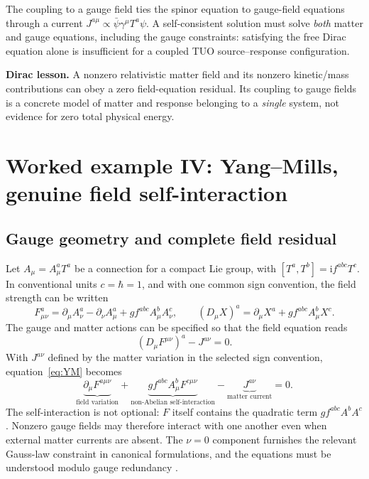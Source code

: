 \documentclass[11pt,a4paper]{article}
\newcommand{\ii}{\mathrm{i}}
\theoremstyle{tmon}
\theoremstyle{definition}
\begin{document}
The coupling to a gauge field ties the spinor equation to gauge-field equations through a current $J^{a\mu}\propto\bar\psi\gamma^\mu T^a\psi$. A self-consistent solution must solve \emph{both} matter and gauge equations, including the gauge constraints: satisfying the free Dirac equation alone is insufficient for a coupled TUO source--response configuration.

\begin{keybox}
\textbf{Dirac lesson.} A nonzero relativistic matter field and its nonzero kinetic/mass contributions can obey a zero field-equation residual. Its coupling to gauge fields is a concrete model of matter and response belonging to a \emph{single} system, not evidence for zero total physical energy.
\end{keybox}

\section{Worked example IV: Yang--Mills, genuine field self-interaction}
\subsection{Gauge geometry and complete field residual}
Let $A_\mu=A_\mu^aT^a$ be a connection for a compact Lie group, with $[T^a,T^b]=\ii f^{abc}T^c$. In conventional units $c=\hbar=1$, and with one common sign convention, the field strength can be written
\begin{equation}\label{eq:FYM}
F^a_{\mu\nu}=\partial_\mu A_\nu^a-\partial_\nu A_\mu^a
+g f^{abc}A_\mu^bA_\nu^c,
\qquad
(D_\mu X)^a=\partial_\mu X^a+g f^{abc}A_\mu^bX^c.
\end{equation}
The gauge and matter actions can be specified so that the field equation reads
\begin{equation}\label{eq:YM}
\boxed{(D_\mu F^{\mu\nu})^a-J^{a\nu}=0.}
\end{equation}
With $J^{a\nu}$ defined by the matter variation in the selected sign convention, equation~\eqref{eq:YM} becomes
\begin{equation}\label{eq:YMexp}
\underbrace{\partial_\mu F^{a\mu\nu}}_{\text{field variation}}
+\underbrace{g f^{abc}A_\mu^bF^{c\mu\nu}}_{\text{non-Abelian self-interaction}}
-\underbrace{J^{a\nu}}_{\text{matter current}}=0.
\end{equation}
The self-interaction is not optional: $F$ itself contains the quadratic term $g f^{abc} A^b A^c$. Nonzero gauge fields may therefore interact with one another even when external matter currents are absent. The $\nu=0$ component furnishes the relevant Gauss-law constraint in canonical formulations, and the equations must be understood modulo gauge redundancy \cite{YangMills1954}.
\end{document}
